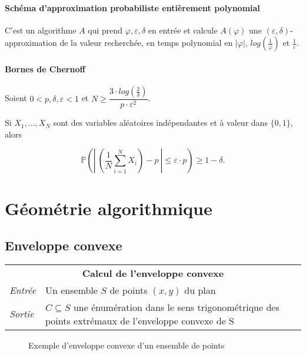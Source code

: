 \documentclass[french]{article}
\begin{document}
\paragraph{Schéma d’approximation probabiliste entièrement polynomial} C'est un algorithme $A$ qui prend $\varphi, \varepsilon, \delta$ en entrée et calcule $A(\varphi)$ une $(\varepsilon, \delta)$-approximation de la valeur recherchée, en temps polynomial en $\left| \varphi \right|$, $log(\frac{1}{\varphi})$ et $\frac{1}{\varepsilon}$.

\paragraph{Bornes de Chernoff} Soient $0 < p, \delta, \varepsilon < 1$ et $N \geq \dfrac{3 \cdot log(\frac{2}{\delta})}{p \cdot \varepsilon^2}$.

Si $X_1, \dots, X_N$ sont des variables aléatoires indépendantes et à valeur dans $ \{ 0, 1 \} $, alors 

\[\mathbb{P}\left( \left| ~ \left( \frac{1}{N} \sum^N_{i = 1}X_i \right) - p ~ \right| \leq \varepsilon \cdot p \right) \geq 1 - \delta.\]
\section{Géométrie algorithmique}

\subsection{Enveloppe convexe}

\vspace{0.5cm}
\begin{tabularx}{\textwidth}{p{1cm}X}
\multicolumn{2}{c}{\textbf{Calcul de l'enveloppe convexe}} \\ 
\emph{Entrée} & Un ensemble $S$ de points $(x,y)$ du plan \\ 
\emph{Sortie} & $C \subseteq S$ une énumération dans le sens trigonométrique des points extrémaux de l'enveloppe convexe de S \\
\end{tabularx}

\begin{figure}[H]
\center
{}
\caption{Exemple d'enveloppe convexe d'un ensemble de points}
\end{figure}
\end{document}
